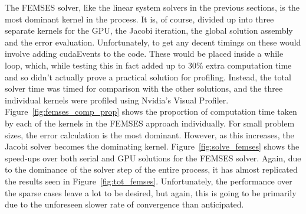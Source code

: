 The FEMSES solver, like the linear system solvers in the previous sections, is the most dominant kernel in the process. It is, of course, divided up into three separate kernels for the GPU, the Jacobi iteration, the global solution assembly and the error evaluation. Unfortunately, to get any decent timings on these would involve adding cudaEvents to the code. These would be placed inside a while loop, which, while testing this in fact added up to 30\% extra computation time and so didn't actually prove a practical solution for profiling. Instead, the total solver time was timed for comparison with the other solutions, and the three individual kernels were profiled using Nvidia's Visual Profiler. Figure~\ref{fig:femses_comp_prop} shows the proportion of computation time taken by each of the kernels in the FEMSES approach individually. For small problem sizes, the error calculation is the most dominant. However, as this increases, the Jacobi solver becomes the dominating kernel. Figure~\ref{fig:solve_femses} shows the speed-ups over both serial and GPU solutions for the FEMSES solver. Again, due to the dominance of the solver step of the entire process, it has almost replicated the results seen in Figure~\ref{fig:tot_femses}. Unfortunately, the performance over the sparse cases leave a lot to be desired, but again, this is going to be primarily due to the unforeseen slower rate of convergence than anticipated.

